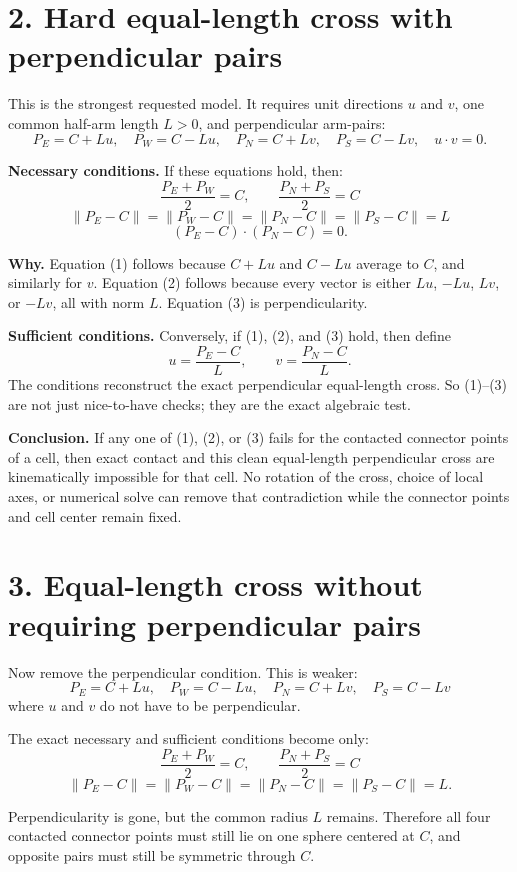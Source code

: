 \documentclass[11pt,letterpaper]{article}
\begin{document}
\section*{2. Hard equal-length cross with perpendicular pairs}

This is the strongest requested model. It requires unit directions \(u\) and \(v\), one common half-arm length \(L>0\), and perpendicular arm-pairs:
\[
P_E=C+Lu,\quad P_W=C-Lu,\quad P_N=C+Lv,\quad P_S=C-Lv,\quad u\cdot v=0.
\]

\textbf{Necessary conditions.} If these equations hold, then:
\[
\frac{P_E+P_W}{2}=C,\qquad \frac{P_N+P_S}{2}=C
\tag{1}
\]
\[
\|P_E-C\|=\|P_W-C\|=\|P_N-C\|=\|P_S-C\|=L
\tag{2}
\]
\[
(P_E-C)\cdot(P_N-C)=0.
\tag{3}
\]

\textbf{Why.} Equation (1) follows because \(C+Lu\) and \(C-Lu\) average to \(C\), and similarly for \(v\). Equation (2) follows because every vector is either \(Lu\), \(-Lu\), \(Lv\), or \(-Lv\), all with norm \(L\). Equation (3) is perpendicularity.

\textbf{Sufficient conditions.} Conversely, if (1), (2), and (3) hold, then define
\[
u=\frac{P_E-C}{L},\qquad v=\frac{P_N-C}{L}.
\]
The conditions reconstruct the exact perpendicular equal-length cross. So (1)--(3) are not just nice-to-have checks; they are the exact algebraic test.

\textbf{Conclusion.} If any one of (1), (2), or (3) fails for the contacted connector points of a cell, then exact contact and this clean equal-length perpendicular cross are kinematically impossible for that cell. No rotation of the cross, choice of local axes, or numerical solve can remove that contradiction while the connector points and cell center remain fixed.

\section*{3. Equal-length cross without requiring perpendicular pairs}

Now remove the perpendicular condition. This is weaker:
\[
P_E=C+Lu,\quad P_W=C-Lu,\quad P_N=C+Lv,\quad P_S=C-Lv
\]
where \(u\) and \(v\) do not have to be perpendicular.

The exact necessary and sufficient conditions become only:
\[
\frac{P_E+P_W}{2}=C,\qquad \frac{P_N+P_S}{2}=C
\tag{4}
\]
\[
\|P_E-C\|=\|P_W-C\|=\|P_N-C\|=\|P_S-C\|=L.
\tag{5}
\]

Perpendicularity is gone, but the common radius \(L\) remains. Therefore all four contacted connector points must still lie on one sphere centered at \(C\), and opposite pairs must still be symmetric through \(C\).
\end{document}
